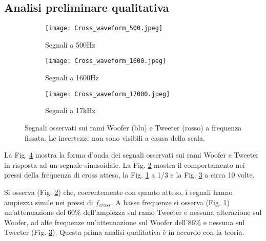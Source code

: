 \documentclass[../Relazione_circuiti]{subfiles}
\begin{document}
\subsection{Analisi preliminare qualitativa}

  \begin{figure}[H]
    \centering

    \begin{subfigure}[b]{0.3\textwidth}
      \centering
      \texttt{[image: Cross\_waveform\_500.jpeg]}

      \caption{Segnali a 500Hz}
      \label{fig:signal_500}

    \end{subfigure}
    \hfill
    \begin{subfigure}[b]{0.3\textwidth}
      \centering
      \texttt{[image: Cross\_waveform\_1600.jpeg]}

      \caption{Segnali a 1600Hz}
      \label{fig:signal_1600}

    \end{subfigure}
    \hfill
    \begin{subfigure}[b]{0.3\textwidth}
      \centering
      \texttt{[image: Cross\_waveform\_17000.jpeg]}

      \caption{Segnali a 17kHz}
      \label{fig:signal_17k}

    \end{subfigure}
    \hfill

    \caption{Segnali osservati sui rami Woofer (blu) e Tweeter (rosso)
      a frequenza fissata. Le incertezze non sono visibili a causa della scala.}

    \label{fig:signal_waveforms}

  \end{figure}


  La Fig. \ref{fig:signal_waveforms} mostra la forma d'onda dei segnali osservati sui rami Woofer e Tweeter in risposta
  ad un segnale sinusoidale.
  La Fig. \ref{fig:signal_1600} mostra il comportamento nei pressi della frequenza di cross attesa, la Fig.
  \ref{fig:signal_500} a 1/3 e la Fig. \ref{fig:signal_17k} a circa 10 volte.

  Si osserva (Fig. \ref{fig:signal_1600}) che, coerentemente con quanto atteso, i segnali hanno ampiezza simile nei
  pressi di $f_{cross}$.
  A basse frequenze si osserva (Fig. \ref{fig:signal_500}) un'attenuazione del 60\% dell'ampiezza sul ramo Tweeter e
  nessuna alterazione sul Woofer, ad alte frequenze un'attenuazione sul Woofer dell'86\% e nessuna sul Tweeter (Fig.
  \ref{fig:signal_17k}). Questa prima analisi qualitativa è in accordo con la teoria.
\end{document}
